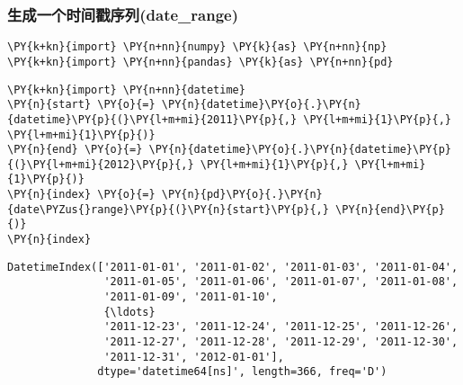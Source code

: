     \hypertarget{ux751fux6210ux4e00ux4e2aux65f6ux95f4ux6233ux5e8fux5217date_range}{%
\subsubsection{生成一个时间戳序列(date\_range)}\label{ux751fux6210ux4e00ux4e2aux65f6ux95f4ux6233ux5e8fux5217date_range}}

    \begin{tcolorbox}[breakable, size=fbox, boxrule=1pt, pad at break*=1mm,colback=cellbackground, colframe=cellborder]
\begin{Verbatim}[commandchars=\\\{\}]
\PY{k+kn}{import} \PY{n+nn}{numpy} \PY{k}{as} \PY{n+nn}{np}
\PY{k+kn}{import} \PY{n+nn}{pandas} \PY{k}{as} \PY{n+nn}{pd}
\end{Verbatim}
\end{tcolorbox}

    \begin{tcolorbox}[breakable, size=fbox, boxrule=1pt, pad at break*=1mm,colback=cellbackground, colframe=cellborder]
\begin{Verbatim}[commandchars=\\\{\}]
\PY{k+kn}{import} \PY{n+nn}{datetime}
\PY{n}{start} \PY{o}{=} \PY{n}{datetime}\PY{o}{.}\PY{n}{datetime}\PY{p}{(}\PY{l+m+mi}{2011}\PY{p}{,} \PY{l+m+mi}{1}\PY{p}{,} \PY{l+m+mi}{1}\PY{p}{)}
\PY{n}{end} \PY{o}{=} \PY{n}{datetime}\PY{o}{.}\PY{n}{datetime}\PY{p}{(}\PY{l+m+mi}{2012}\PY{p}{,} \PY{l+m+mi}{1}\PY{p}{,} \PY{l+m+mi}{1}\PY{p}{)}
\PY{n}{index} \PY{o}{=} \PY{n}{pd}\PY{o}{.}\PY{n}{date\PYZus{}range}\PY{p}{(}\PY{n}{start}\PY{p}{,} \PY{n}{end}\PY{p}{)}
\PY{n}{index}
\end{Verbatim}
\end{tcolorbox}

            \begin{tcolorbox}[breakable, size=fbox, boxrule=.5pt, pad at break*=1mm, opacityfill=0]
\begin{Verbatim}[commandchars=\\\{\}]
DatetimeIndex(['2011-01-01', '2011-01-02', '2011-01-03', '2011-01-04',
               '2011-01-05', '2011-01-06', '2011-01-07', '2011-01-08',
               '2011-01-09', '2011-01-10',
               {\ldots}
               '2011-12-23', '2011-12-24', '2011-12-25', '2011-12-26',
               '2011-12-27', '2011-12-28', '2011-12-29', '2011-12-30',
               '2011-12-31', '2012-01-01'],
              dtype='datetime64[ns]', length=366, freq='D')
\end{Verbatim}
\end{tcolorbox}
        
